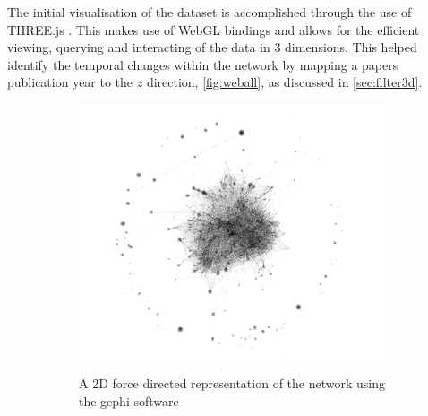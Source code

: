 The initial visualisation of the dataset is accomplished through the use of THREE.js \citep{threejs}. This makes use of WebGL bindings and allows for the efficient viewing, querying and interacting of the data in 3 dimensions. This helped identify the temporal changes within the network by mapping a papers publication year to the $z$ direction, \autoref{fig:weball}, as discussed in \autoref{sec:filter3d}. 

\begin{figure}[H] %
     \centering
     \hfill
     \begin{subfigure}{0.495\textwidth}
         \centering
         \includegraphics[width=\textwidth]{figures_c3/gephiall.png}
         \caption{A 2D force directed representation of the network using the gephi software \citep{gephi}}
         \label{fig:gall}
     \end{subfigure}
     \hfill
     \begin{subfigure}{0.47\textwidth}
         \centering

\end{subfigure}
\end{figure}
